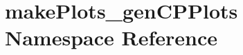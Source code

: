 \hypertarget{namespacemakePlots__genCPPlots}{
\section{makePlots\_\-genCPPlots Namespace Reference}
\label{namespacemakePlots__genCPPlots}
}
